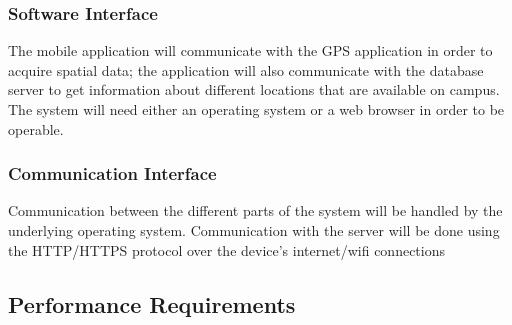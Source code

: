     \subsubsection{Software Interface}
    The mobile application will communicate with the GPS application in order to acquire spatial data; the application will also communicate with the database server to get information about different locations that are available on campus. The system will need either an operating system or a web browser in order to be operable.
        
    \subsubsection{Communication Interface}
    Communication between the different parts of the system will be handled by the underlying operating system. Communication with the server will be done using the HTTP/HTTPS protocol over the device's internet/wifi connections

\subsection{Performance Requirements}
